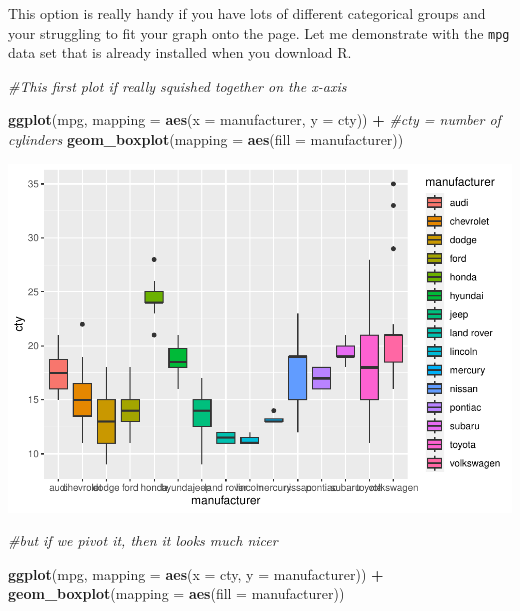\documentclass[
]{book}
\newenvironment{Shaded}{\begin{snugshade}}{\end{snugshade}}
\newcommand{\AttributeTok}[1]{\textcolor[rgb]{0.13,0.29,0.53}{#1}}
\newcommand{\CommentTok}[1]{\textcolor[rgb]{0.56,0.35,0.01}{\textit{#1}}}
\newcommand{\FunctionTok}[1]{\textcolor[rgb]{0.13,0.29,0.53}{\textbf{#1}}}
\newcommand{\NormalTok}[1]{#1}
\newcommand{\SpecialCharTok}[1]{\textcolor[rgb]{0.81,0.36,0.00}{\textbf{#1}}}
\begin{document}
This option is really handy if you have lots of different categorical groups and your struggling to fit your graph onto the page. Let me demonstrate with the \texttt{mpg} data set that is already installed when you download R.

\begin{Shaded}
\begin{Highlighting}[]
\CommentTok{\#This first plot if really squished together on the x{-}axis}

\FunctionTok{ggplot}\NormalTok{(mpg, }\AttributeTok{mapping =} \FunctionTok{aes}\NormalTok{(}\AttributeTok{x =}\NormalTok{ manufacturer, }\AttributeTok{y =}\NormalTok{ cty)) }\SpecialCharTok{+} \CommentTok{\#cty = number of cylinders }
  \FunctionTok{geom\_boxplot}\NormalTok{(}\AttributeTok{mapping =} \FunctionTok{aes}\NormalTok{(}\AttributeTok{fill =}\NormalTok{ manufacturer))}
\end{Highlighting}
\end{Shaded}

\includegraphics{rintro_demo_files/figure-latex/unnamed-chunk-299-1.pdf}

\begin{Shaded}
\begin{Highlighting}[]
\CommentTok{\#but if we pivot it, then it looks much nicer}

\FunctionTok{ggplot}\NormalTok{(mpg, }\AttributeTok{mapping =} \FunctionTok{aes}\NormalTok{(}\AttributeTok{x =}\NormalTok{ cty, }\AttributeTok{y =}\NormalTok{ manufacturer)) }\SpecialCharTok{+}
  \FunctionTok{geom\_boxplot}\NormalTok{(}\AttributeTok{mapping =} \FunctionTok{aes}\NormalTok{(}\AttributeTok{fill =}\NormalTok{ manufacturer))}
\end{Highlighting}
\end{Shaded}
\end{document}
